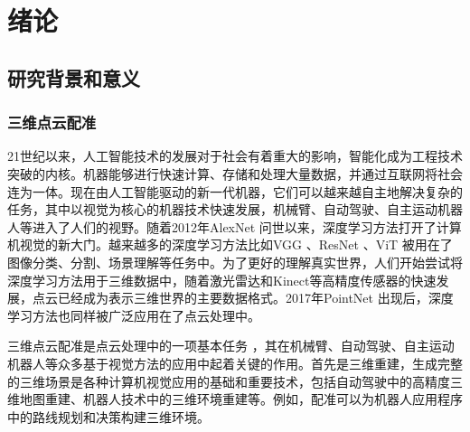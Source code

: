 %
%
%
%
%
%

\chapter{绪论}

\section{研究背景和意义}

\subsection{三维点云配准}
21世纪以来，人工智能技术的发展对于社会有着重大的影响，智能化成为工程技术突破的内核。机器能够进行快速计算、存储和处理大量数据，并通过互联网将社会连为一体。现在由人工智能驱动的新一代机器，它们可以越来越自主地解决复杂的任务，其中以视觉为核心的机器技术快速发展，机械臂、自动驾驶、自主运动机器人等进入了人们的视野。随着2012年AlexNet\cite{krizhevsky2017imagenet} 问世以来，深度学习方法打开了计算机视觉的新大门。越来越多的深度学习方法比如VGG\cite{simonyan2014very} 、ResNet\cite{he2016deep} 、ViT\cite{dosovitskiy2020image} 被用在了图像分类、分割、场景理解等任务中。为了更好的理解真实世界，人们开始尝试将深度学习方法用于三维数据中，随着激光雷达和Kinect等高精度传感器的快速发展，点云已经成为表示三维世界的主要数据格式。2017年PointNet\cite{qi2017pointnet} 出现后，深度学习方法也同样被广泛应用在了点云处理中。

三维点云配准是点云处理中的一项基本任务\cite{qi2017pointnet,huang2021comprehensive,besl1992method} ，其在机械臂、自动驾驶、自主运动机器人等众多基于视觉方法的应用中起着关键的作用。首先是三维重建，生成完整的三维场景是各种计算机视觉应用的基础和重要技术，包括自动驾驶中的高精度三维地图重建、机器人技术中的三维环境重建等。例如，配准可以为机器人应用程序中的路线规划和决策构建三维环境。

